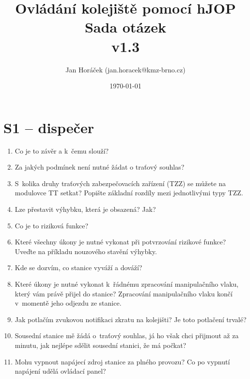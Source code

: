 \documentclass[12pt,a4paper]{article}
\begin{document}
\thispagestyle{empty}
\noindent

\title{
\Large Ovládání kolejiště pomocí hJOP\\
\LARGE Sada otázek\\
\small v1.3}
\author{Jan Horáček (jan.horacek@kmz-brno.cz)}
\date{\today}
\maketitle

\section*{S1 – dispečer}

\begin{enumerate}[leftmargin=*]
\item Co je to závěr a k~čemu slouží?

\item Za jakých podmínek není nutné žádat o traťový souhlas?

\item S~kolika druhy traťových zabezpečovacích zařízení (TZZ) se můžete na
modulovce TT setkat? Popište základní rozdíly mezi jednotlivými typy TZZ.

\item Lze přestavit výhybku, která je obsazená? Jak?

\item Co je to riziková funkce?

\item Které všechny úkony je nutné vykonat při potvrzování rizikové funkce?
Uveďte na příkladu nouzového stavění výhybky.

\item Kde se dozvím, co stanice vyváží a dováží?

\item Které úkony je nutné vykonat k~řádnému zpracování manipulačního vlaku,
který vám právě přijel do stanice? Zpracování manipulačního vlaku končí
v~momentě jeho odjezdu ze stanice.

\item Jak potlačím zvukovou notifikaci zkratu na kolejišti? Je toto potlačení
trvalé?

\item Sousední stanice mě žádá o~traťový souhlas, já ho však chci přijmout až
za minutu, jak nejlépe sdělit sousední stanici, že má počkat?

\item Mohu vypnout napájecí zdroj stanice za plného provozu? Co po vypnutí
napájení udělá ovládací panel?


\end{enumerate}
\end{document}
